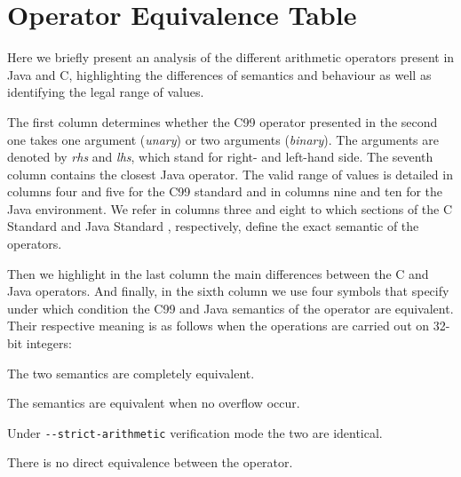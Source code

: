 \documentclass[a4paper,twoside]{article}
\newcommand{\Inline}[1]{\lstinline[basicstyle=\ttfamily]|#1|}
\let\oldsection\section
\renewcommand\section{\cleardoublepage\oldsection}
\begin{document}
\appendix

\section{Operator Equivalence Table}
\label{ops_checklist}

\newcommand{\VHeader}[1]{\rotatebox{90}{\textbf{#1}}}
\renewcommand{\labelitemi}{$\diamond$}
\setlength{\leftmargini}{1em}

Here we briefly present an analysis of the different arithmetic operators
present in Java and C, highlighting the differences of semantics and behaviour
as well as identifying the legal range of values.

The first column determines whether the C99 operator presented in the second one
takes one argument (\emph{unary}) or two arguments (\emph{binary}). The
arguments are denoted by \emph{rhs} and \emph{lhs}, which stand for right- and
left-hand side. The seventh column contains the closest Java operator. The valid
range of values is detailed in columns four and five for the C99 standard and in
columns nine and ten for the Java environment. We refer in columns three and
eight to which sections of the C Standard \cite{c99} and Java Standard
\cite{java8}, respectively, define the exact semantic of the operators.

Then we highlight in the last column the main differences between the C and Java
operators. And finally, in the sixth column we use four symbols that specify
under which condition the C99 and Java semantics of the operator are equivalent.
Their respective meaning is as follows when the operations are carried out on
32-bit integers:

\newcommand{\SemEqual}{\checkmark}
\newcommand{\SemOverflow}{$\mathcal{O}$}%
\newcommand{\SemStrict}{$\mathcal{S}$}%
\newcommand{\SemNA}{\ding{53}}

\begin{description}[style=nextline]
\item[\SemEqual] The two semantics are completely equivalent.
\item[\SemOverflow] The semantics are equivalent when no overflow occur.
\item[\SemStrict] Under \Inline{--strict-arithmetic} verification mode the two
are identical.
\item[\SemNA] There is no direct equivalence between the operator.
\end{description}
\end{document}
